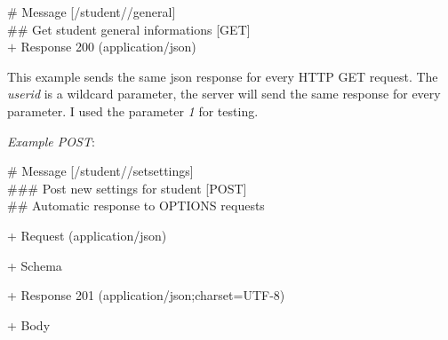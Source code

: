 \# Message {[}/student//general{]}\\
\#\# Get student general informations [GET]\\
$+$ Response 200 (application/json)
\begin{addmargin}[1em]{1em}
\end{addmargin}

This example sends the same json response for every HTTP GET request. The \emph{userid} is a wildcard parameter, the server will send the same response for every parameter. I used the parameter \emph{1} for testing.


\emph{Example POST}:

\# Message {[}/student//setsettings{]}\\
\#\#\# Post new settings for student {[}POST{]}\\
\#\# Automatic response to OPTIONS requests

+ Request (application/json)
\begin{addmargin}[1em]{1em}
	+ Schema
	\begin{addmargin}[1em]{1em}
	\end{addmargin}
\end{addmargin}

+ Response 201 (application/json;charset=UTF-8)
\begin{addmargin}[1em]{1em}
	+ Body
	\begin{addmargin}[1em]{1em}
	\end{addmargin}
\end{addmargin}

